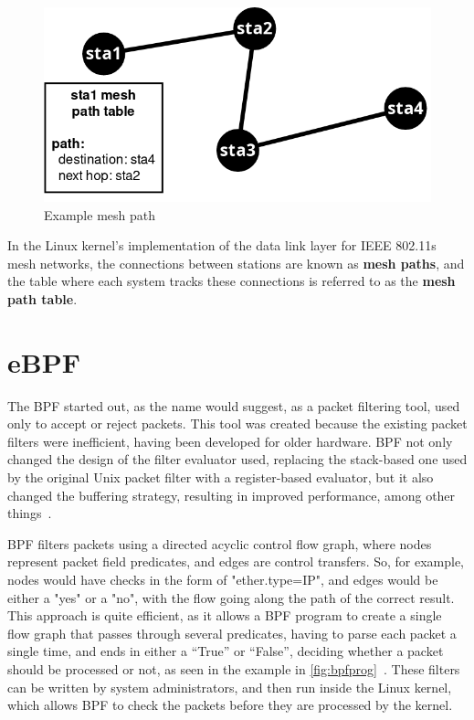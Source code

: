 \begin{figure}[htb]
   \centering
   \includegraphics[scale=.4]{nexthop}
   \caption{Example mesh path}\label{fig:nexthop}
\end{figure}

In the Linux kernel's implementation of the data link layer for \ac{IEEE}
802.11s mesh networks, the connections between stations are known as
\textbf{mesh paths}, and the table where each system tracks these connections is
referred to as the \textbf{mesh path table}.


\section{eBPF}

The \ac{BPF} started out, as the name would suggest, as a packet filtering tool,
used only to accept or reject packets. This tool was created because the
existing packet filters were inefficient, having been developed for older
hardware. \ac{BPF} not only changed the design of the filter evaluator used,
replacing the stack-based one used by the original Unix packet filter with a
register-based evaluator, but it also changed the buffering strategy, resulting
in improved performance, among other things~\cite{bpf}.

\ac{BPF} filters packets using a directed acyclic control flow graph, where
nodes represent packet field predicates, and edges are control transfers. So,
for example, nodes would have checks in the form of "ether.type=IP", and edges
would be either a "yes" or a "no", with the flow going along the path of the
correct result. This approach is quite efficient, as it allows a \ac{BPF}
program to create a single flow graph that passes through several predicates,
having to parse each packet a single time, and ends in either a ``True'' or
``False'', deciding whether a packet should be processed or not, as seen in the
example in \autoref{fig:bpfprog}~\cite{bpf}. These filters can be written by
system administrators, and then run inside the Linux kernel, which allows
\ac{BPF} to check the packets before they are processed by the kernel.

